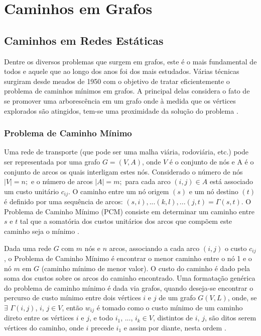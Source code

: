 \chapter{Caminhos em Grafos}

\section{Caminhos em Redes Estáticas}
Dentre os diversos problemas que surgem em grafos, este é o mais fundamental de todos e
aquele que ao longo dos anos foi dos mais estudados. Várias técnicas surgiram desde meados
de 1950 com o objetivo de tratar eficientemente o problema de caminhos mínimos em grafos. A
principal delas considera o fato de se promover uma arborescência em um grafo onde à medida
que os vértices explorados são atingidos, tem-se uma proximidade da solução do problema \cite{negreirosbook}.

\subsection{Problema de Caminho Mínimo}
Uma rede de transporte (que pode ser uma malha viária, rodoviária, etc.) pode ser
representada por uma grafo $G = (V, A)$, onde $V$ é o conjunto de nós e A é o conjunto de arcos
os quais interligam estes nós. Considerado o número de nós $|V| = n;$ e o número de arcos $|A| = m;$ para
cada arco $(i, j) \in A$ está associado um custo unitário $c_{ij}$. O caminho entre um
nó origem $(s)$ e um nó destino $(t)$ é definido por uma sequência de
arcos: $(s,i),...(k,l),...(j,t) = \Gamma(s,t)$. O Problema de Caminho Mínimo (PCM) consiste em determinar
um caminho entre $s$ e $t$ tal que a somatória dos custos unitários dos arcos que compõem este caminho seja o mínimo \cite{cunha}.

Dada uma rede $G$ com $m$ nós e $n$ arcos, associando a cada arco $(i,j)$ o custo $c_{ij}$, o Problema
de Caminho Mínimo é encontrar o menor caminho entre o nó 1 e o nó $m$ em $G$ (caminho mínimo de menor valor).
O custo do caminho é dado pela soma dos custos sobre os arcos do caminho encontrado. Uma formatação genérica do problema
de caminho mínimo é dada via grafos, quando deseja-se encontrar o percurso de custo mínimo entre dois vértices $i$ e $j$
de um grafo $G(V,L)$, onde, se $\exists$ $\Gamma (i,j)$, $i$, $j \in V$, então $w_{ij}$ é tomado como o custo mínimo
de um caminho direto entre os vértices $i$ e $j$, e todo $i_1$, ..., $i_k \in V$, distintos de $i$, $j$, são ditos
serem vértices do caminho, onde $i$ precede $i_1$ e assim por diante, nesta ordem \cite{negreirosbook}.

